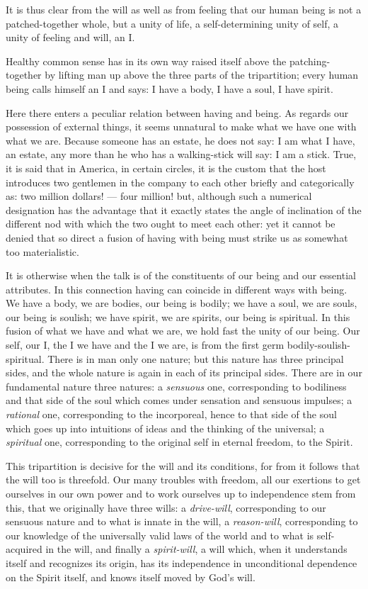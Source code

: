 \documentclass[12pt,a4paper,openany]{book}
\newcommand{\opage}[1]{\marginnote{\footnotesize\textit{[#1]}}}
\begin{document}
It is thus clear from the will as well as from feeling that
our human being is not a patched-together whole,
but a unity of life, a self-determining unity of self, a
unity of feeling and will, an I.

Healthy common sense has in its own way raised itself above
the patching-together by lifting man up above the three parts of the
\setcounter{footnote}{0}%
\opage{14}tripartition; every human being calls himself an I and says:
I have a body, I have a soul, I have spirit.

Here there enters a peculiar relation between
having and being. As regards our possession of external
things, it seems unnatural to make what we have
one with what we are. Because someone has an estate,
he does not say: I am what I have, an estate,
any more than he who has a walking-stick will say: I am a stick.
True, it is said that in America, in certain circles, it is the custom that
the host introduces two gentlemen in the company to each other briefly
and categorically as: two million dollars! --- four million! but,
although such a numerical designation has the advantage that it
exactly states the angle of inclination of the different nod with which
the two ought to meet each other: yet it cannot
be denied that so direct a fusion of having
with being must strike us as somewhat too materialistic.

It is otherwise when the talk is of the constituents of our being
and our essential attributes. In this connection
having can coincide in different ways with
being. We have a body, we are bodies, our being
is bodily; we have a soul, we are souls, our being is
soulish; we have spirit, we are spirits, our being is
spiritual. In this fusion of what we have and
what we are, we hold fast the unity of our being. %
Our self,
our I, the I we have and the I we are, is from the first
germ bodily-soulish-spiritual. There is in man
only one nature; but this nature has three principal sides, and
the whole nature is again in each of its principal sides. There
are in our fundamental nature three natures: a \emph{sensuous} one, corresponding
to bodiliness and that side of the soul which comes
under sensation and sensuous impulses; a \emph{rational} one,
corresponding to the incorporeal, hence to that side of the soul
which goes up into intuitions of ideas and the thinking of the universal;
a \emph{spiritual} one, corresponding to the original self in eternal freedom,
to the Spirit.

This tripartition is decisive for the will and its
conditions, for from it follows that the will too is threefold.
\setcounter{footnote}{0}%
\opage{15}Our many troubles with freedom, all our exertions
to get ourselves in our own power and to work ourselves up to independence
stem from this, that we originally have three wills:
a \emph{drive-will}, corresponding to our sensuous nature and to what
is innate in the will, a \emph{reason-will}, corresponding to our
knowledge of the universally valid laws of the world and to what is
self-acquired in the will, and finally a \emph{spirit-will}, a will which,
when it understands itself and recognizes its origin,
has its independence in unconditional dependence on the Spirit
itself, and knows itself moved by God's will.
\end{document}
